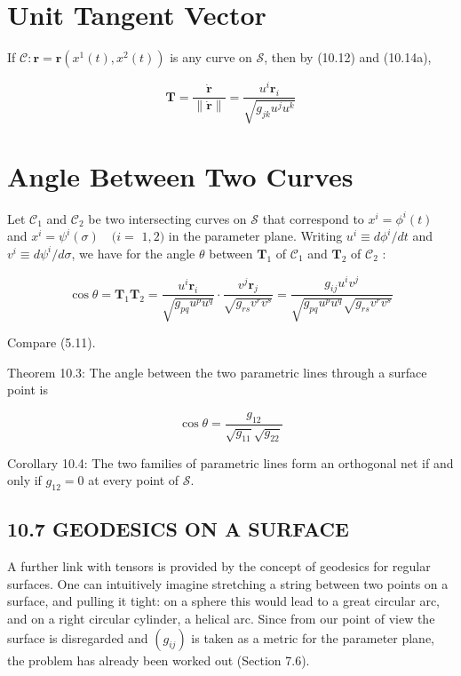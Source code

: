 \documentclass[10pt]{article}
\begin{document}
\section*{Unit Tangent Vector}
If $\mathscr{C}: \mathbf{r}=\mathbf{r}\left(x^{1}(t), x^{2}(t)\right)$ is any curve on $\mathscr{S}$, then by (10.12) and (10.14a),


\begin{equation*}
\mathbf{T}=\frac{\dot{\mathbf{r}}}{\|\dot{\mathbf{r}}\|}=\frac{u^{i} \mathbf{r}_{i}}{\sqrt{g_{j k} u^{j} u^{k}}} \tag{10.17}
\end{equation*}


\section*{Angle Between Two Curves}
Let $\mathscr{C}_{1}$ and $\mathscr{C}_{2}$ be two intersecting curves on $\mathscr{S}$ that correspond to $x^{i}=\phi^{i}(t)$ and $x^{i}=\psi^{i}(\sigma) \quad(i=$ $1,2)$ in the parameter plane. Writing $u^{i} \equiv d \phi^{i} / d t$ and $v^{i} \equiv d \psi^{i} / d \sigma$, we have for the angle $\theta$ between $\mathbf{T}_{1}$ of $\mathscr{C}_{1}$ and $\mathbf{T}_{2}$ of $\mathscr{C}_{2}$ :


\begin{equation*}
\cos \theta=\mathbf{T}_{1} \mathbf{T}_{2}=\frac{u^{i} \mathbf{r}_{i}}{\sqrt{g_{p q} u^{p} u^{q}}} \cdot \frac{v^{j} \mathbf{r}_{j}}{\sqrt{g_{r s} v^{r} v^{s}}}=\frac{g_{i j} u^{i} v^{j}}{\sqrt{g_{p q} u^{p} u^{q}} \sqrt{g_{r s} v^{r} v^{s}}} \tag{10.18}
\end{equation*}


Compare (5.11).

Theorem 10.3: The angle between the two parametric lines through a surface point is


\begin{equation*}
\cos \theta=\frac{g_{12}}{\sqrt{g_{11}} \sqrt{g_{22}}} \tag{10.19}
\end{equation*}


Corollary 10.4: The two families of parametric lines form an orthogonal net if and only if $g_{12}=0$ at every point of $\mathscr{S}$.

\subsection*{10.7 GEODESICS ON A SURFACE}
A further link with tensors is provided by the concept of geodesics for regular surfaces. One can intuitively imagine stretching a string between two points on a surface, and pulling it tight: on a sphere this would lead to a great circular arc, and on a right circular cylinder, a helical arc. Since from our point of view the surface is disregarded and $\left(g_{i j}\right)$ is taken as a metric for the parameter plane, the problem has already been worked out (Section 7.6).
\end{document}

